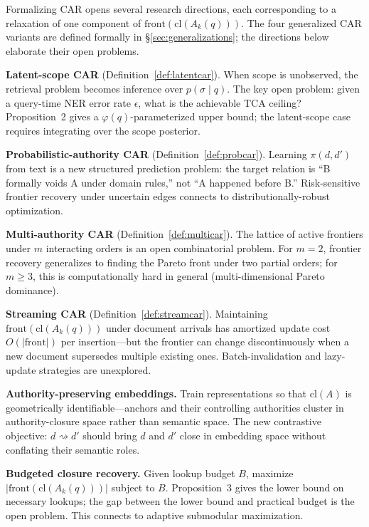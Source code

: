 \documentclass[11pt]{article}
\begin{document}
Formalizing CAR opens several research directions, each corresponding to a relaxation of one component of $\mathrm{front}(\mathrm{cl}(A_k(q)))$. The four generalized CAR variants are defined formally in \S\ref{sec:generalizations}; the directions below elaborate their open problems.

\textbf{Latent-scope CAR} (Definition~\ref{def:latentcar}). When scope is unobserved, the retrieval problem becomes inference over $p(\sigma \mid q)$. The key open problem: given a query-time NER error rate $\epsilon$, what is the achievable TCA ceiling? Proposition~2 gives a $\varphi(q)$-parameterized upper bound; the latent-scope case requires integrating over the scope posterior.

\textbf{Probabilistic-authority CAR} (Definition~\ref{def:probcar}). Learning $\pi(d,d')$ from text is a new structured prediction problem: the target relation is ``B formally voids A under domain rules,'' not ``A happened before B.'' Risk-sensitive frontier recovery under uncertain edges connects to distributionally-robust optimization.

\textbf{Multi-authority CAR} (Definition~\ref{def:multicar}). The lattice of active frontiers under $m$ interacting orders is an open combinatorial problem. For $m = 2$, frontier recovery generalizes to finding the Pareto front under two partial orders; for $m \geq 3$, this is computationally hard in general (multi-dimensional Pareto dominance).

\textbf{Streaming CAR} (Definition~\ref{def:streamcar}). Maintaining $\mathrm{front}(\mathrm{cl}(A_k(q)))$ under document arrivals has amortized update cost $O(|\mathrm{front}|)$ per insertion---but the frontier can change discontinuously when a new document supersedes multiple existing ones. Batch-invalidation and lazy-update strategies are unexplored.

\textbf{Authority-preserving embeddings.} Train representations so that $\mathrm{cl}(A)$ is geometrically identifiable---anchors and their controlling authorities cluster in authority-closure space rather than semantic space. The new contrastive objective: $d \rightsquigarrow d'$ should bring $d$ and $d'$ close in embedding space without conflating their semantic roles.

\textbf{Budgeted closure recovery.} Given lookup budget $B$, maximize $|\mathrm{front}(\mathrm{cl}(A_k(q)))|$ subject to $B$. Proposition~3 gives the lower bound on necessary lookups; the gap between the lower bound and practical budget is the open problem. This connects to adaptive submodular maximization.
\end{document}
